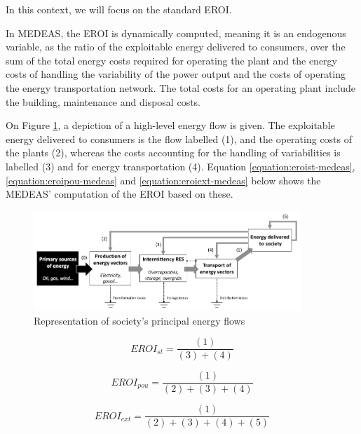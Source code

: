In this context, we will focus on the standard EROI.

In MEDEAS, the EROI is dynamically computed, meaning it is an endogenous variable, as the ratio of the exploitable energy delivered to consumers, over the sum of the total energy costs required for operating the plant and the energy costs of handling the variability of the power output and the costs of operating the energy transportation network. The total costs for an operating plant include the building, maintenance and disposal costs.

On Figure \ref{fig:eroi-energy-flows}, a depiction of a high-level energy flow is given. The exploitable energy delivered to consumers is the flow labelled (1), and the operating costs of the plants (2), whereas the costs accounting for the handling of variabilities is labelled (3) and for energy transportation (4). Equation \ref{equation:eroist-medeas}, \ref{equation:eroipou-medeas} and \ref{equation:eroiext-medeas} below shows the MEDEAS' computation of the EROI based on these.

\begin{figure}[h]
    \includegraphics[width=0.9\textwidth]{resources/images/EROI.png}
    \caption{Representation of society's principal energy flows\cite{medeas-eroi}}
    \label{fig:eroi-energy-flows}
\end{figure}

\begin{equation}
    EROI_{st} = \frac{(1)}{(3) + (4)}
    \label{equation:eroist-medeas}
\end{equation}

 \begin{equation}
    EROI_{pou} = \frac{(1)}{(2) + (3) + (4)}
    \label{equation:eroipou-medeas}
 \end{equation}

 \begin{equation}
    EROI_{ext} = \frac{(1)}{(2) + (3) + (4) + (5)}
    \label{equation:eroiext-medeas}
 \end{equation}


